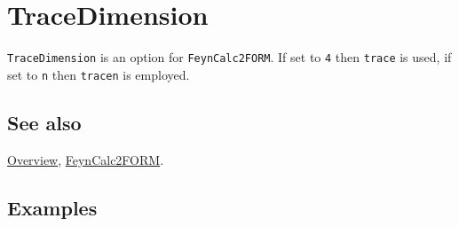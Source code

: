 \documentclass[../FeynCalcManual.tex]{subfiles}
\begin{document}
\hypertarget{tracedimension}{%
\section{TraceDimension}\label{tracedimension}}

\texttt{TraceDimension} is an option for \texttt{FeynCalc2FORM}. If set
to \texttt{4} then \texttt{trace} is used, if set to \texttt{n} then
\texttt{tracen} is employed.

\subsection{See also}

\hyperlink{toc}{Overview}, \hyperlink{feyncalc2form}{FeynCalc2FORM}.

\subsection{Examples}
\end{document}

